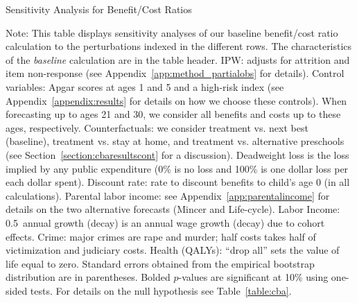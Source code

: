 \begin{table}
\begin{threeparttable}
\caption{Sensitivity Analysis for Benefit/Cost Ratios}
\label{table:bcsens}
\centering
\scriptsize

\begin{tablenotes}
\scriptsize
\item Note: This table displays sensitivity analyses of our baseline benefit/cost ratio calculation to the perturbations indexed in the different rows. The characteristics of the \textit{baseline} calculation are in the table header. IPW: adjusts for attrition and item non-response (see  Appendix~\ref{app:method_partialobs} for details). Control variables: Apgar scores at ages 1 and 5 and a high-risk index (see  Appendix~\ref{appendix:results} for details on how we choose these controls). When forecasting up to ages 21 and 30, we consider all benefits and costs up to these ages, respectively. Counterfactuals: we consider treatment vs. next best (baseline), treatment vs. stay at home, and treatment vs. alternative preschools (see Section~\ref{section:cbaresultscont} for a discussion). Deadweight loss is the loss implied by any public expenditure (0\% is no loss and 100\% is one dollar loss per each dollar spent). Discount rate: rate to discount benefits to child's age 0 (in all calculations). Parental labor income: see  Appendix~\ref{app:parentalincome} for details on the two alternative forecasts (Mincer and Life-cycle). Labor Income: 0.5\ annual growth (decay) is an annual wage growth (decay) due to cohort effects. Crime: major crimes are rape and murder; half costs takes half of victimization and judiciary costs. Health (QALYs): ``drop all'' sets the value of life equal to zero. Standard errors obtained from the empirical bootstrap distribution are in parentheses. Bolded $p$-values are significant at 10\% using one-sided tests. For details on the null hypothesis see Table~\ref{table:cba}.
\end{tablenotes}
\end{threeparttable}
\end{table}

